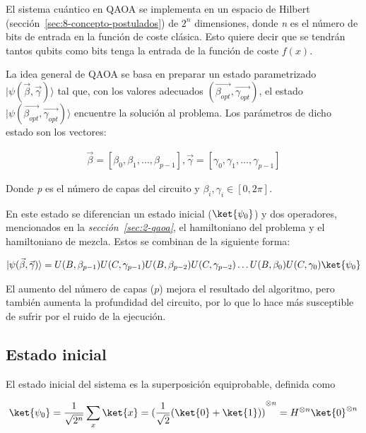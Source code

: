 El sistema cuántico en QAOA se implementa en un espacio de Hilbert (sección~\ref{sec:8-concepto-postulados}) de $2^n$ dimensiones, donde \textit{n} es el número de bits de entrada en la función de coste clásica. Esto quiere decir que se tendrán tantos qubits como bits tenga la entrada de la función de coste $f(x)$.

La idea general de QAOA se basa en preparar un estado parametrizado \(\lvert \psi(\vec{\beta}, \vec{\gamma})\rangle\) tal que, con los valores adecuados \( (\vec{\beta_{opt}}, \vec{\gamma_{opt}}) \), el estado \(\lvert\psi(\vec{\beta_{opt}}, \vec{\gamma_{opt}})\rangle\) encuentre la solución al problema. Los parámetros de dicho estado son los vectores:

\begin{align}
  \vec{\beta} = [\beta_0, \beta_1, \ldots , \beta_{p-1}], \vec{\gamma} = [\gamma_0, \gamma_1, \ldots , \gamma_{p-1}]
\end{align}

Donde \textit{p} es el número de capas del circuito y $\beta_i, \gamma_i \in{[0, 2\pi]}$.

En este estado se diferencian un estado inicial ($\ket{\psi_0}$) y dos operadores, mencionados en la \textit{sección~\ref{sec:2-qaoa}}, el hamiltoniano del problema y el hamiltoniano de mezcla.
Estos se combinan de la siguiente forma:

\begin{align}
  \lvert \psi(\vec{\beta}, \vec{\gamma})\rangle = U(B, \beta_{p-1})U(C, \gamma_{p-1})U(B, \beta_{p-2})U(C, \gamma_{p-2}) \ldots U(B, \beta_0)U(C, \gamma_0) \ket{\psi_0}
\end{align}

El aumento del número de capas ($p$) mejora el resultado del algoritmo, pero también aumenta la profundidad del circuito, por lo que lo hace más susceptible de sufrir por el ruido de la ejecución.

\subsection{Estado inicial}
El estado inicial del sistema es la superposición equiprobable, definida como

\begin{align}
  \ket{\psi_0} = \frac{1}{\sqrt{2^n}} \sum_x\ket{x}
  = {(\frac{1}{\sqrt{2}} (\ket{0} + \ket{1}))}^{\otimes n}
  = H^{\otimes n} \ket{0}^{\otimes n}
\end{align}

